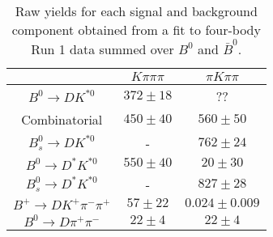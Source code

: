 \begin{table}
  \centering
  \begin{tabular}{ccc}
      \toprule
       & $K\pi\pi\pi$ & $\pi K\pi\pi$ \\
      \midrule
      $B^0 \to DK^{*0}$ & $372 \pm 18$ & ?? \\
      Combinatorial & $450 \pm 40$ & $560 \pm 50$ \\
      $B^0_s \to DK^{*0}$ & \-- & $762 \pm 24$ \\
      $B^0 \to D^*K^{*0}$ & $550 \pm 40$ & $20 \pm 30$ \\
      $B^0_s \to D^*K^{*0}$ & \-- & $827 \pm 28$ \\
      $B^+ \to DK^+\pi^-\pi^+$ & $57 \pm 22$ & $0.024 \pm 0.009$ \\
      $B^0 \to D\pi^+\pi^-$ & $22 \pm 4$ & $22 \pm 4$ \\
      \bottomrule
      \end{tabular}
  \caption{Raw yields for each signal and background component obtained from a fit to four-body Run 1 data summed over $B^0$ and $\bar{B}^0$.}
\label{tab:yields_combined_4body_run1}
\end{table}
